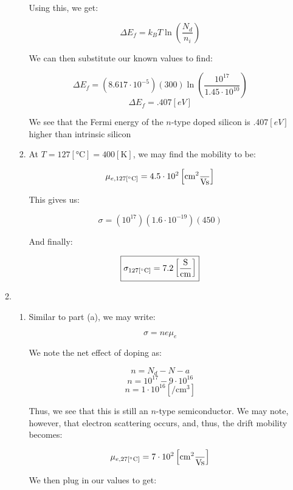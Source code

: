 \begin{enumerate}
\begin{enumerate}[label=\alph*.]
\begin{enumerate}[label=\arabic*.]
            Using this, we get:

            $$\Delta E_f=k_BT\ln\left(\frac{N_d}{n_i}\right)$$

            We can then substitute our known values to find:

            $$\Delta E_f=\left( 8.617\cdot10^{-5} \right)(300)\ln\left(\frac{10^{17}}{1.45\cdot10^{10}}\right)$$
            $$\boxed{\Delta E_f=.407[\si{eV}]}$$

            We see that the Fermi energy of the $n$-type doped silicon is .407$[\si{eV}]$ higher than intrinsic silicon

          \item At $T=127[\si{\celsius}]=400[\si{\kelvin}]$, we may find the mobility to be:

            $$\mu_{e,127[\si{\celsius}]}=4.5\cdot10^2\left[ \si{\centi\meter\squared\over\volt\second} \right]$$

            This gives us:

            $$\sigma=\left( 10^{17} \right)(1.6\cdot10^{-19})(450)$$

            And finally:

            $$\boxed{\sigma_{127[\si{\celsius}]}=7.2\left[ \si{\siemens\over\centi\meter} \right]}$$

        \end{enumerate}

      \item 

        \begin{enumerate}[label=\arabic*.]

          \item Similar to part (a), we may write:

            $$\sigma=ne\mu_e$$

            We note the net effect of doping as:

            $$n=N_d-N-a$$
            $$n=10^{17}-9\cdot10^{16}$$
            $$n=1\cdot10^{16}\left[ \si{\per\centi\meter\cubed} \right]$$

            Thus, we see that this is still an $n$-type semiconductor. We may note, however, that electron scattering occurs, and, thus, the drift mobility becomes:

            $$\mu_{e,27[\si{\celsius}]}=7\cdot10^2\left[ \si{\centi\meter\squared\over\volt\second} \right]$$

            We then plug in our values to get:


\end{enumerate}
\end{enumerate}
\end{enumerate}
